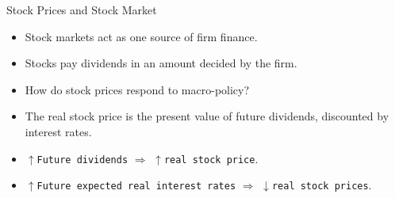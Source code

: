 \documentclass[shownotes,11pt, aspectratio=169]{beamer}
\begin{document}
\begin{frame}
\begin{center}
\end{center}
\end{frame}

\begin{frame}{Stock Prices and Stock Market}
\begin{itemize}
\item Stock markets act as one source of firm finance.
\pause
\item Stocks pay dividends in an amount decided by the firm.
\pause
\item How do stock prices respond to macro-policy?
\pause
\item The real stock price is the present value of future dividends, discounted by interest rates.
\pause
\item $\uparrow$\texttt{Future dividends} $\Rightarrow$ $\uparrow$\texttt{real stock price}.
\item $\uparrow$\texttt{Future expected real interest rates} $\Rightarrow$ $\downarrow$\texttt{real stock prices}.
\end{itemize}
\end{frame}
\end{document}
